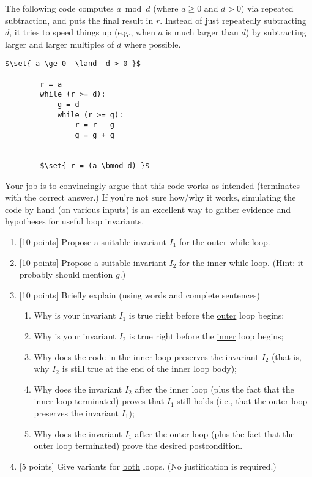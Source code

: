 \documentclass[12pt,letterpaper,boxed,cm]{hmcpset}
\newcommand{\set}[1]{\left\{#1\right\}}
\begin{document}
\begin{problem}[2.]
    [35 points] The following code computes $a \bmod d$ (where $a \ge 0$ and $d > 0$) via repeated subtraction, and puts the final result in $r$. Instead of just repeatedly subtracting $d$, it tries to speed things up (e.g., when $a$ is much larger than $d$) by subtracting larger and larger multiples of $d$ where possible.
    \begin{lstlisting}[mathescape]
        $\set{ a \ge 0  \land  d > 0 }$

        r = a
        while (r >= d):
            g = d
            while (r >= g):
                r = r - g
                g = g + g


        $\set{ r = (a \bmod d) }$
    \end{lstlisting}

    Your job is to convincingly argue that this code works as intended (terminates with the correct answer.) If you're not sure how/why it works, simulating the code by hand (on various inputs) is an excellent way to gather evidence and hypotheses for useful loop invariants.
    \begin{enumerate}[label = \Alph*.]
        \item {[10 points]} Propose a suitable invariant $I_1$ for the outer while loop.
        \item {[10 points]} Propose a suitable invariant $I_2$ for the inner while loop. (Hint: it probably should mention $g$.)
        \item {[10 points]} Briefly explain (using words and complete sentences)
        \begin{enumerate}[label=\alph*.]
            \item Why is your invariant $I_1$ is true right before the \ul{outer} loop begins;
            \item Why is your invariant $I_2$ is true right before the \ul{inner} loop begins;
            \item  Why does the code in the inner loop preserves the invariant $I_2$  (that is, why $I_2$ is still true at the end of the inner loop body);
            \item Why does the invariant $I_2$ after the inner loop (plus the fact that the inner loop terminated) proves that $I_1$ still holds (i.e., that the outer loop preserves the invariant $I_1$);
            \item Why does the invariant $I_1$ after the outer loop (plus the fact that the outer loop terminated) prove the desired postcondition.
        \end{enumerate}
        \item {[5 points]} Give variants for \ul{both} loops. (No justification is required.)
    \end{enumerate}
\end{problem}
\end{document}
